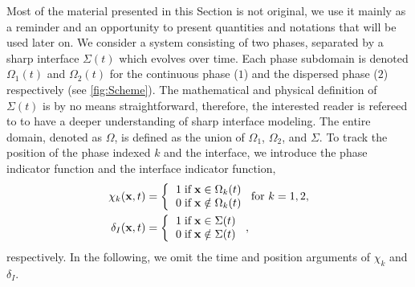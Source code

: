 Most of the material presented in this Section is not original, we use it mainly as
a reminder and an opportunity to present quantities and notations that will be
used later on.
We consider a system consisting of two phases, separated by a sharp interface $\Sigma(t)$ which evolves over time. 
Each phase subdomain is denoted $\Omega_1(t)$ and $\Omega_2(t)$ for the continuous phase ($1$) and the dispersed phase ($2$) respectively (see \ref{fig:Scheme}). 
The mathematical and physical definition of $\Sigma(t)$ is by no means straightforward, therefore, the interested reader is refereed to \cite{bothe2022sharp} to have a deeper understanding of sharp interface modeling. 
The entire domain, denoted as $\Omega$, is defined as the union of $\Omega_1$, $\Omega_2$, and $\Sigma$.
To track the position of the phase indexed $k$ and the interface, we introduce the phase indicator function and the interface indicator function, 
\begin{align}
    \chi_k(\textbf{x},t) &=  \left\{
      \begin{tabular}{cc}
        $1 \;\text{if} \;\textbf{x} \in \Omega_k(t)$\\
        $0 \;\text{if} \;\textbf{x} \notin \Omega_k(t)$
      \end{tabular}
      \right.
      \text{for $k = 1,2$},
      \label{eq:PIF}\\
    \delta_I(\textbf{x},t) &=  \left\{
      \begin{tabular}{cc}
        $1 \;\text{if} \;\textbf{x} \in \Sigma(t)$\\
        $0 \;\text{if} \;\textbf{x} \notin \Sigma(t)$
      \end{tabular}
      \right.,
      \label{eq:PIF_I}
\end{align}
respectively. 
In the following, we omit the time and position arguments of $\chi_k$ and $\delta_I$. 
